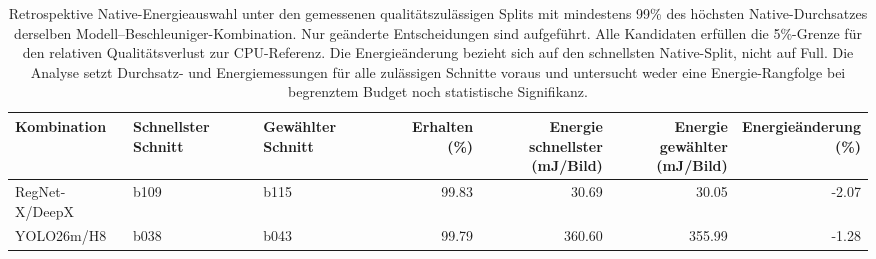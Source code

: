 \begin{table}[t]
\centering\small
\setlength{\tabcolsep}{3pt}
\caption{Retrospektive Native-Energieauswahl unter den gemessenen qualitätszulässigen Splits mit mindestens 99\% des höchsten Native-Durchsatzes derselben Modell--Beschleuniger-Kombination. Nur geänderte Entscheidungen sind aufgeführt. Alle Kandidaten erfüllen die 5\%-Grenze für den relativen Qualitätsverlust zur CPU-Referenz. Die Energieänderung bezieht sich auf den schnellsten Native-Split, nicht auf Full. Die Analyse setzt Durchsatz- und Energiemessungen für alle zulässigen Schnitte voraus und untersucht weder eine Energie-Rangfolge bei begrenztem Budget noch statistische Signifikanz.}
\label{tab:energy-floor-99}
\begin{tabular*}{\textwidth}{@{\extracolsep{\fill}}lllrrrr@{}}
\toprule
Kombination & Schnellster Schnitt & Gewählter Schnitt & Erhalten (\%) & \shortstack{Energie schnellster\\(mJ/Bild)} & \shortstack{Energie gewählter\\(mJ/Bild)} & \shortstack{Energieänderung\\(\%)} \\
\midrule
RegNet-X/DeepX & b109 & b115 & 99.83 & 30.69 & 30.05 & -2.07 \\
YOLO26m/H8 & b038 & b043 & 99.79 & 360.60 & 355.99 & -1.28 \\
\bottomrule
\end{tabular*}
\end{table}
